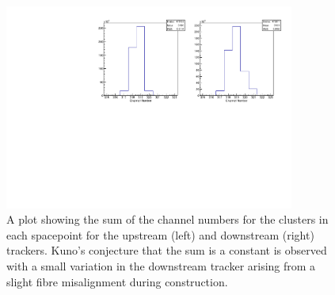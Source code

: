 


 \begin{figure}[p]
    \centering
    \includegraphics[width=0.85\textwidth, angle=0]{08-Performance/kuno_plot.pdf}
    \caption{\label{fig:kuno} A plot showing the sum of the channel numbers for the clusters in each spacepoint for the upstream (left) and downstream (right) trackers. Kuno's conjecture that the sum is a constant is observed with a small variation in the downstream tracker arising from a slight fibre misalignment during construction.}
  \end{figure}

